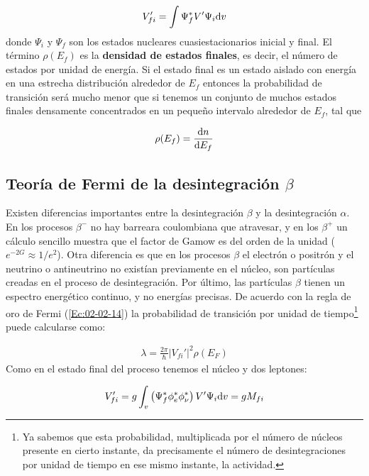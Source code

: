 \begin{equation}
	V_{fi}'= \int \Psi_f^* V' \Psi_i \mathrm{d} v
\end{equation}
donde $\Psi_i$ y $\Psi_f$ son los estados nucleares cuasiestacionarios inicial y final. El término $\rho(E_f)$ es la \textbf{densidad de estados finales}, es decir, el número de estados por unidad de energía. Si el estado final es un estado aislado con energía en una estrecha distribución alrededor de $E_f$ entonces la probabilidad de transición será mucho menor que si tenemos un conjunto de muchos estados finales densamente concentrados en un pequeño intervalo alrededor de $E_f$, tal que

\begin{eqnarray}
	\rho(E_f) = \frac{\mathrm{d} n}{\mathrm{d} E_f}
\end{eqnarray}

\subsection{Teoría de Fermi de la desintegración $\beta$}

Existen diferencias importantes entre la desintegración $\beta$ y la desintegración $\alpha$.  En los procesos $\beta^-$ no hay barreara coulombiana que atravesar, y en los $\beta^+$ un cálculo sencillo muestra que el factor de Gamow es del orden de la unidad ($e^{-2G} \approx 1/e^2$). Otra diferencia es que en los procesos $\beta$ el electrón o positrón y el neutrino o antineutrino no existían previamente en el núcleo, son partículas creadas en el proceso de desintegración. Por último, las partículas $\beta$ tienen un espectro energético continuo, y no energías precisas. De acuerdo con la regla de oro de Fermi (\ref{Ec:02-02-14}) la probabilidad de transición por unidad de tiempo\footnote{Ya sabemos que esta probabilidad, multiplicada por el número de núcleos presente en cierto instante, da precisamente el número de desintegraciones por unidad de tiempo en ese mismo instante, la actividad.} puede calcularse como: 

\begin{eqnarray}
	\lambda = \frac{2\pi}{\hbar} |V_{fi}'|^2 \rho (E_F)
\end{eqnarray}
Como en el estado final del proceso tenemos el núcleo y dos leptones:

\begin{eqnarray}
	V_{fi}'  = g \int_v \left( \Psi_f^* \phi_e^* \phi_\nu^* \right) V' \Psi_i \mathrm{d} v = g M_{fi}
\end{eqnarray}

